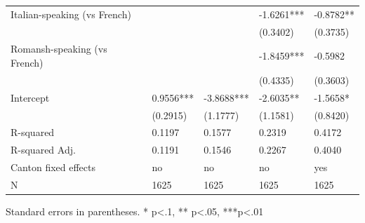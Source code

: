 \begin{table}
\begin{center}
\begin{tabular}{lllll}
Italian-speaking (vs French)         &           &            & -1.6261*** & -0.8782**  \\
                                     &           &            & (0.3402)   & (0.3735)   \\
Romansh-speaking (vs French)         &           &            & -1.8459*** & -0.5982    \\
                                     &           &            & (0.4335)   & (0.3603)   \\
Intercept                            & 0.9556*** & -3.8688*** & -2.6035**  & -1.5658*   \\
                                     & (0.2915)  & (1.1777)   & (1.1581)   & (0.8420)   \\
R-squared                            & 0.1197    & 0.1577     & 0.2319     & 0.4172     \\
R-squared Adj.                       & 0.1191    & 0.1546     & 0.2267     & 0.4040     \\
Canton fixed effects                 & no        & no         & no         & yes        \\
N                                    & 1625      & 1625       & 1625       & 1625       \\
\hline
\end{tabular}
\end{center}
\end{table}
\bigskip
Standard errors in parentheses. \newline 
* p<.1, ** p<.05, ***p<.01